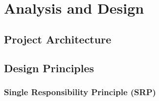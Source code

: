 \chapter{Analysis and Design}
\label{chapter:title}
\section{Project Architecture}
\section{Design Principles}
\subsection{Single Responsibility Principle (SRP)}